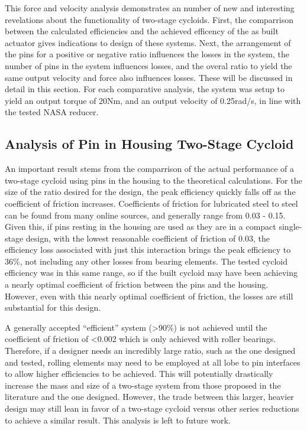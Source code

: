 This force and velocity analysis demonstrates an number of new and interesting revelations about the functionality of two-stage cycloids. First, the comparrison between the calculated efficiencies and the achieved efficency of the as built actuator gives indications to design of these systems. Next, the arrangement of the pins for a positive or negative ratio influences the losses in the system, the number of pins in the system influences losses, and the overal ratio to yield the same output velocity and force also influences losses. These will be discussed in detail in this section. For each comparative analysis, the system was setup to yield an output torque of 20Nm, and an output velocity of 0.25rad/s, in line with the tested NASA reducer.

\subsection{Analysis of Pin in Housing Two-Stage Cycloid} \label{ch:dual:discussion:actual}

An important result stems from the comparrison of the actual performance of a two-stage cycloid using pins in the housing to the theoretical calculations. For the size of the ratio desired for the design, the peak efficiency quickly falls off as the coefficient of friction increases. Coefficients of friction for lubricated steel to steel can be found from many online sources, and generally range from 0.03 - 0.15. Given this, if pins resting in the housing are used as they are in a compact single-stage design, with the lowest reasonable coefficient of friction of 0.03, the efficiency loss associated with just this interaction brings the peak efficiency to 36\%, not including any other losses from bearing elements. The tested cycloid efficiency was in this same range, so if the built cycloid may have been achieving a nearly optimal coefficient of friction between the pins and the housing. However, even with this nearly optimal coefficient of friction, the losses are still substantial for this design. 


A generally accepted ``efficient'' system (>90\%) is not achieved until the coefficient of friction of <0.002 which is only achieved with roller bearings. Therefore, if a designer needs an incredibly large ratio, such as the one designed and tested, rolling elements may need to be employed at all lobe to pin interfaces to allow higher efficiencies to be achieved. This will potentially drastically increase the mass and size of a two-stage system from those proposed in the literature and the one designed. However, the trade between this larger, heavier design may still lean in favor of a two-stage cycloid versus other series reductions to achieve a similar result. This analysis is left to future work. 

